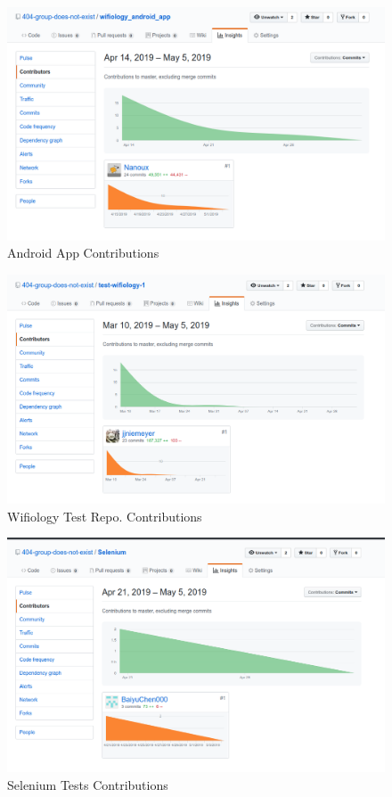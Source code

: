 \documentclass[]{article}
\begin{document}
	\begin{figure}[h]
	\label{fig:android_app_contrib}
	\includegraphics[width=1.0\textwidth]{androidAppContrib}
	\caption{Android App Contributions}
	\end{figure}
	
	\begin{figure}[h]
	\label{fig:wifiology_test_contrib}
	\includegraphics[width=1.0\textwidth]{testWifiologyContrib}
	\caption{Wifiology Test Repo. Contributions}
	\end{figure}
	
	\begin{figure}[h]
	\label{fig:selenium_tests_contrib}
	\includegraphics[width=1.0\textwidth]{seleniumTestsContrib}
	\caption{Selenium Tests Contributions}
	\end{figure}
	
\end{document}
